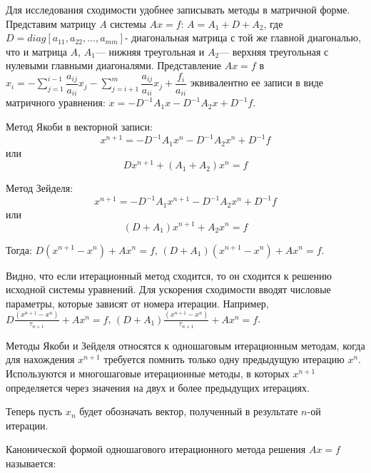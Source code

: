 \par Для исследования сходимости удобнее записывать методы в матричной форме. Представим матрицу $A$ системы $Ax=f$: $A=A_{1}+D+A_{2}$, где $D=diag\left[ a_{11},a_{22},\ldots,a_{mm}\right]$- диагональная матрица с той же главной диагональю, что и матрица $A$, $A_{1}$— нижняя треугольная и $A_{2}$— верхняя треугольная с нулевыми главными диагоналями. Представление $Ax=f$ в $x_{i}=-\sum ^{i-1}_{j=1}\dfrac{a_{ij}}{a_{ii}}x_{j}-\sum ^{m}_{j=i+1}\dfrac{a_{ij}}{a_{ii}}x_{j}+\dfrac{f_{i}}{a_{ii}}$ эквивалентно ее записи в виде матричного уравнения: $x=-D^{-1}A_{1}x-D^{-1}A_{2}x+D^{-1}f$.
\par Метод Якоби в векторной записи: 
\begin{equation*}
   x^{n+1}=-D^{-1}A_{1}x^{n}-D^{-1}A_{2}x^{n}+D^{-1}f 
\end{equation*}
или 
\begin{equation*}
    Dx^{n+1}+\left( A_{1}+A_{2}\right)x^{n}=f
\end{equation*}
\par Метод Зейделя: 
\begin{equation*}
    x^{n+1}=-D^{-1}A_{1}x^{n+1}-D^{-1}A_{2}x^{n}+D^{-1}f
\end{equation*} 
или 
\begin{equation*}
    \left( D+A_{1}\right)x^{n+1}+A_{2}x^{n}=f
\end{equation*}
\par Тогда: $D\left( x^{n+1}-x^{n}\right)+Ax^n=f$, $\left( D+A_{1}\right)\left( x^{n+1}-x^{n}\right)+Ax^n=f$. 
\par Видно, что если итерационный метод сходится, то он сходится к решению исходной системы уравнений. Для ускорения сходимости вводят числовые параметры, которые зависят от номера итерации. Например, $D\frac{\left( x^{n+1}-x^{n}\right)}{\tau _{n+1}}+Ax^{n}=f$, $\left( D+A_{1}\right)\frac{\left( x^{n+1}-x^{n}\right)}{\tau _{n+1}}+Ax^{n}=f$.
\par Методы Якоби и Зейделя относятся к одношаговым итерационным методам, когда для нахождения $x^{n+1}$ требуется помнить только одну предыдущую итерацию $x^{n}$. Используются и многошаговые итерационные методы, в которых $x^{n+1}$ определяется через значения на двух и более предыдущих итерациях.
\par Теперь пусть $x_{n}$ будет обозначать вектор, полученный в результате $n$-ой итерации. 
\par Канонической формой одношагового итерационного метода решения $Ax=f$ называется: 
